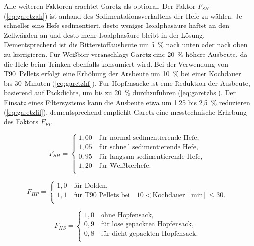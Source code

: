 \documentclass[a4paper,parskip=half]{scrartcl}
\newcommand{\umin}{\:[\textrm{min}]}
\newcommand{\FAH}{F_{\mathit{SH}}}
\newcommand{\FHF}{F_{\mathit{HP}}}
\newcommand{\FHS}{F_{\mathit{HS}}}
\newcommand{\FFil}{F_{\mathit{FI}}}
\begin{document}
Alle weiteren Faktoren erachtet Garetz als optional. Der Faktor $\FAH$ (\autoref{eq:garetzah}) ist anhand des Sedimentationsverhaltens der Hefe zu wählen. Je schneller eine Hefe sedimentiert, desto weniger Isoalphasäure haftet an den Zellwänden an und desto mehr Isoalphasäure bleibt in der Lösung. Dementsprechend ist die Bitterstoffausbeute um 5~\% nach unten oder nach oben zu korrigieren.  Für Weißbier veranschlagt Garetz eine 20~\% höhere Ausbeute, da die Hefe beim Trinken ebenfalls konsumiert wird. Bei der Verwendung von T90~Pellets erfolgt eine Erhöhung der Ausbeute um 10~\% bei einer Kochdauer bis 30~Minuten (\autoref{eq:garetzhf}). Für Hopfensäcke ist eine Reduktion der Ausbeute, basierend auf Packdichte, um bis zu 20~\% durchzuführen (\autoref{eq:garetzhs}). Der Einsatz eines Filtersystems kann die Ausbeute etwa um 1,25 bis 2,5~\% reduzieren (\autoref{eq:garetzfil}), dementsprechend empfiehlt Garetz eine messtechnische Erhebung des Faktors $\FFil$. \parencite[140\psq]{Garetz1994}

\begin{equation}
\FAH = \begin{cases}
1,00 \quad \text{für normal sedimentierende Hefe}, \\
1,05 \quad \text{für schnell sedimentierende Hefe}, \\
0,95 \quad \text{für langsam sedimentierende Hefe}, \\
1,20 \quad \text{für Weißbierhefe}. \\
\end{cases}
\label{eq:garetzah}
\end{equation}


\begin{equation}
\FHF = \begin{cases}
1,0 \quad \text{für Dolden}, \\
1,1 \quad \text{für T90~Pellets bei} \quad 10 < \text{Kochdauer} \umin \le 30. \\
\end{cases}
\label{eq:garetzhf}
\end{equation}

\begin{equation}
\FHS = \begin{cases}
1,0 \quad \text{ohne Hopfensack}, \\
0,9 \quad \text{für lose gepackten Hopfensack}, \\
0,8 \quad \text{für dicht gepackten Hopfensack}. \\
\end{cases}
\label{eq:garetzhs}
\end{equation}
\end{document}
